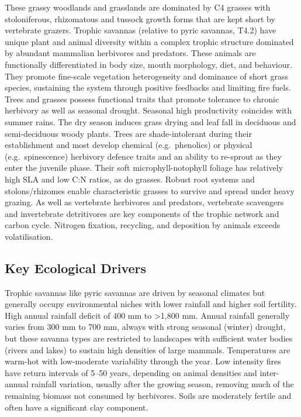\documentclass[
  letterpaper,
  DIV=11,
  numbers=noendperiod]{scrartcl}
\begin{document}
These grassy woodlands and grasslands are dominated by C4 grasses with
stoloniferous, rhizomatous and tussock growth forms that are kept short
by vertebrate grazers. Trophic savannas (relative to pyric savannas,
T4.2) have unique plant and animal diversity within a complex trophic
structure dominated by abundant mammalian herbivores and predators.
These animals are functionally differentiated in body size, mouth
morphology, diet, and behaviour. They promote fine-scale vegetation
heterogeneity and dominance of short grass species, sustaining the
system through positive feedbacks and limiting fire fuels. Trees and
grasses possess functional traits that promote tolerance to chronic
herbivory as well as seasonal drought. Seasonal high productivity
coincides with summer rains. The dry season induces grass drying and
leaf fall in deciduous and semi-deciduous woody plants. Trees are
shade-intolerant during their establishment and most develop chemical
(e.g.~phenolics) or physical (e.g.~spinescence) herbivory defence traits
and an ability to re-sprout as they enter the juvenile phase. Their soft
microphyll-notophyll foliage has relatively high SLA and low C:N ratios,
as do grasses. Robust root systems and stolons/rhizomes enable
characteristic grasses to survive and spread under heavy grazing. As
well as vertebrate herbivores and predators, vertebrate scavengers and
invertebrate detritivores are key components of the trophic network and
carbon cycle. Nitrogen fixation, recycling, and deposition by animals
exceeds volatilisation.

\subsection{Key Ecological Drivers}\label{key-ecological-drivers-83}

Trophic savannas like pyric savannas are driven by seasonal climates but
generally occupy environmental niches with lower rainfall and higher
soil fertility. High annual rainfall deficit of 400 mm to
\textgreater1,800 mm. Annual rainfall generally varies from 300 mm to
700 mm, always with strong seasonal (winter) drought, but these savanna
types are restricted to landscapes with sufficient water bodies (rivers
and lakes) to sustain high densities of large mammals. Temperatures are
warm-hot with low-moderate variability through the year. Low intensity
fires have return intervals of 5--50 years, depending on animal
densities and inter-annual rainfall variation, usually after the growing
season, removing much of the remaining biomass not consumed by
herbivores. Soils are moderately fertile and often have a significant
clay component.
\end{document}
